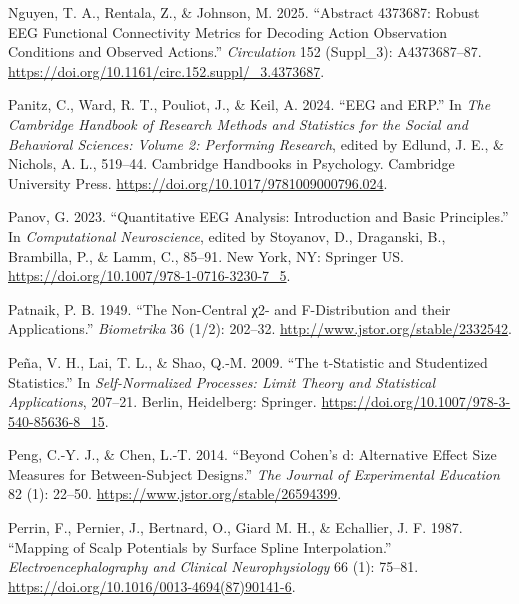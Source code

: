 \documentclass[
]{article}
\newlength{\cslhangindent}
\newlength{\cslentryspacingunit} %
\newenvironment{CSLReferences}[2] %
 {%
  \setlength{\parindent}{0pt}
  \ifodd #1
  \let\oldpar\par
  \def\par{\hangindent=\cslhangindent\oldpar}
  \fi
  \setlength{\parskip}{#2\cslentryspacingunit}
 }%
 {}
\begin{document}
\begin{CSLReferences}{1}{0}
\leavevmode{}%
Nguyen, T. A., Rentala, Z., \& Johnson, M. 2025. {``Abstract 4373687:
Robust EEG Functional Connectivity Metrics for Decoding Action
Observation Conditions and Observed Actions.''} \emph{Circulation} 152
(Suppl\_3): A4373687--87.
\url{https://doi.org/10.1161/circ.152.suppl/_3.4373687}.

\leavevmode{}%
Panitz, C., Ward, R. T., Pouliot, J., \& Keil, A. 2024. {``EEG and
ERP.''} In \emph{The Cambridge Handbook of Research Methods and
Statistics for the Social and Behavioral Sciences: Volume 2: Performing
Research}, edited by Edlund, J. E., \& Nichols, A. L., 519--44.
Cambridge Handbooks in Psychology. Cambridge University Press.
\url{https://doi.org/10.1017/9781009000796.024}.

\leavevmode{}%
Panov, G. 2023. {``Quantitative EEG Analysis: Introduction and Basic
Principles.''} In \emph{Computational Neuroscience}, edited by Stoyanov,
D., Draganski, B., Brambilla, P., \& Lamm, C., 85--91. New York, NY:
Springer US. \url{https://doi.org/10.1007/978-1-0716-3230-7_5}.

\leavevmode{}%
Patnaik, P. B. 1949. {``{The Non-Central χ2- and F-Distribution and
their Applications}.''} \emph{Biometrika} 36 (1/2): 202--32.
\url{http://www.jstor.org/stable/2332542}.

\leavevmode{}%
Peña, V. H., Lai, T. L., \& Shao, Q.-M. 2009. {``{The t-Statistic and
Studentized Statistics}.''} In \emph{{Self-Normalized Processes: Limit
Theory and Statistical Applications}}, 207--21. Berlin, Heidelberg:
Springer. \url{https://doi.org/10.1007/978-3-540-85636-8_15}.

\leavevmode{}%
Peng, C.-Y. J., \& Chen, L.-T. 2014. {``Beyond Cohen's d: Alternative
Effect Size Measures for Between-Subject Designs.''} \emph{The Journal
of Experimental Education} 82 (1): 22--50.
\url{https://www.jstor.org/stable/26594399}.

\leavevmode{}%
Perrin, F., Pernier, J., Bertnard, O., Giard M. H., \& Echallier, J. F.
1987. {``Mapping of Scalp Potentials by Surface Spline Interpolation.''}
\emph{Electroencephalography and Clinical Neurophysiology} 66 (1):
75--81. \url{https://doi.org/10.1016/0013-4694(87)90141-6}.


\end{CSLReferences}
\end{document}
